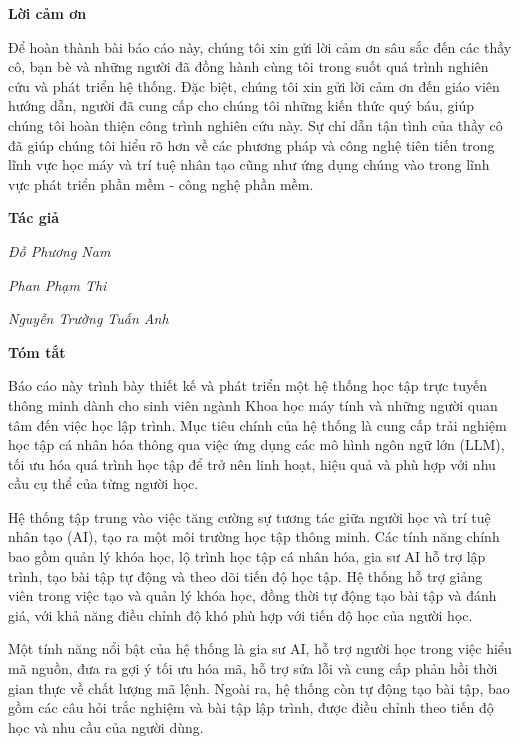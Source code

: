 \documentclass[12pt,a4paper]{report}
\theoremstyle{definition}
\begin{document}
\begin{center}
    \textbf{\Large Lời cảm ơn}
\end{center}

\par Để hoàn thành bài báo cáo này, chúng tôi xin gửi lời cảm ơn sâu sắc đến các thầy cô, bạn bè và những người đã đồng hành cùng tôi trong suốt quá trình nghiên cứu và phát triển hệ thống. Đặc biệt, chúng tôi xin gửi lời cảm ơn đến giáo viên hướng dẫn, người đã cung cấp cho chúng tôi những kiến thức quý báu, giúp chúng tôi hoàn thiện công trình nghiên cứu này. Sự chỉ dẫn tận tình của thầy cô đã giúp chúng tôi hiểu rõ hơn về các phương pháp và công nghệ tiên tiến trong lĩnh vực học máy và trí tuệ nhân tạo cũng như ứng dụng chúng vào trong lĩnh vực phát triển phần mềm - công nghệ phần mềm.

\par\hfill\textbf{Tác giả}\hspace{1cm}
\par\hfill\textit{Đỗ Phương Nam}
\par\hfill\textit{Phan Phạm Thi}\hspace{0.3cm}
\par\hfill\textit{Nguyễn Trường Tuấn Anh}\hspace{0.2cm}
\newpage

\begin{center}
    \textbf{\Large Tóm tắt}
\end{center}

\par Báo cáo này trình bày thiết kế và phát triển một hệ thống học tập trực tuyến thông minh dành cho sinh viên ngành Khoa học máy tính và những người quan tâm đến việc học lập trình. Mục tiêu chính của hệ thống là cung cấp trải nghiệm học tập cá nhân hóa thông qua việc ứng dụng các mô hình ngôn ngữ lớn (LLM), tối ưu hóa quá trình học tập để trở nên linh hoạt, hiệu quả và phù hợp với nhu cầu cụ thể của từng người học.

\par Hệ thống tập trung vào việc tăng cường sự tương tác giữa người học và trí tuệ nhân tạo (AI), tạo ra một môi trường học tập thông minh. Các tính năng chính bao gồm quản lý khóa học, lộ trình học tập cá nhân hóa, gia sư AI hỗ trợ lập trình, tạo bài tập tự động và theo dõi tiến độ học tập. Hệ thống hỗ trợ giảng viên trong việc tạo và quản lý khóa học, đồng thời tự động tạo bài tập và đánh giá, với khả năng điều chỉnh độ khó phù hợp với tiến độ học của người học.

\par Một tính năng nổi bật của hệ thống là gia sư AI, hỗ trợ người học trong việc hiểu mã nguồn, đưa ra gợi ý tối ưu hóa mã, hỗ trợ sửa lỗi và cung cấp phản hồi thời gian thực về chất lượng mã lệnh. Ngoài ra, hệ thống còn tự động tạo bài tập, bao gồm các câu hỏi trắc nghiệm và bài tập lập trình, được điều chỉnh theo tiến độ học và nhu cầu của người dùng.
\end{document}
